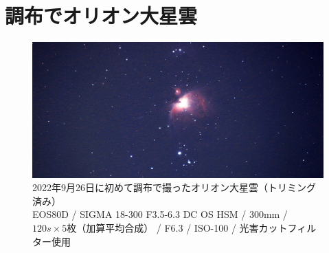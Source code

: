 \documentclass[../../super_nova_2023]{subfiles}
\begin{document}
\chapter{調布でオリオン大星雲}
\begin{figure}[H]
	\centering
	\includegraphics[width=\textwidth]{figures/Yosuke/2022_09_26_Orion_crop.jpg}
	\caption{2022年9月26日に初めて調布で撮ったオリオン大星雲（トリミング済み）\mbox{}\\EOS80D / SIGMA 18-300 F3.5-6.3 DC OS HSM / 300mm / $120\si{s} \times 5枚$（加算平均合成） / F6.3 / ISO-100 / 光害カットフィルター使用 }
	\label{fig:firstOrion}
\end{figure}
\end{document}

